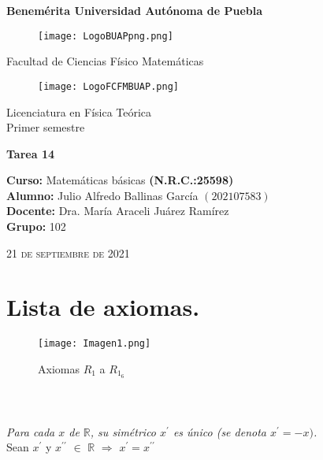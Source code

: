 \documentclass[12pt]{article}
\begin{document}
\thispagestyle{empty} 
\begin{center} \LARGE{\bf Benemérita Universidad Autónoma de Puebla} \\[0.5cm]
\begin{figure}[htb] \centering \texttt{[image: LogoBUAPpng.png]} \end{figure}
\LARGE{Facultad de Ciencias Físico Matemáticas}\\[0.5cm]
\begin{figure}[htb] \centering \texttt{[image: LogoFCFMBUAP.png]} \end{figure} 
\Large{Licenciatura en Física Teórica}\\[0.5cm]
\large{Primer semestre} \end{center}
\begin{center} { \Large \bfseries{Tarea 14}} \\ \end{center}
\large{\bf Curso:} Matemáticas básicas \textbf{(N.R.C.:25598)}\\
\large{\bf Alumno:} Julio Alfredo Ballinas García $\left(202107583\right)$ \\
\large{\bf Docente:} Dra. María Araceli Juárez Ramírez\\
\large{\bf Grupo:} 102\\ \begin{center} 
\vfill
\textsc{21 de septiembre de 2021} \end{center}  
\newpage
\sffamily
\section*{Lista de axiomas.}

\begin{figure}[htb] \centering \texttt{[image: Imagen1.png]} 
\caption{Axiomas $R_1$ a $R_1_6$}
\end{figure} 

\newpage

\section*{{}}\\

{\textit{Para cada $x$ de $\mathbb{R}$, su simétrico $x^{\prime}$ es único (se denota $x^{\prime}=-x)$.}}\\

{} Sean $x^{\prime}$ y $x^{{\prime}{\prime}}$ $\in$  $\mathbb{R}$ $\Rightarrow$ $x^{\prime}= x^{{\prime}{\prime}}$
\end{document}
